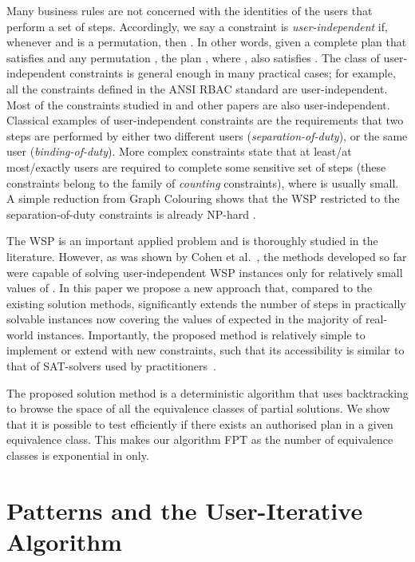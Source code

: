\documentclass[runningheads,proof]{llncs}
\begin{document}
Many business rules are not concerned with the identities of the users that perform a set of steps.  Accordingly, we say a constraint  is \emph{user-independent} if, whenever  and  is a permutation, then . 
In other words, given a complete plan  that satisfies  and any permutation , the plan , where , also satisfies .
The class of user-independent constraints is general enough in many practical cases; for example, all the constraints defined in the ANSI RBAC standard \cite{ANSI04} are user-independent. 
Most of the constraints studied in \cite{FAW2014,JOCO2014,CrGuYe13,WaLi10} and other papers are also user-independent. 
Classical examples of user-independent constraints are the requirements that two steps are performed by either two different users ({\em separation-of-duty}), or the same user ({\em binding-of-duty}). More complex constraints state that at least/at most/exactly  users are required to complete some sensitive set of steps (these constraints belong to the family of \emph{counting} constraints), where  is usually small. 
A simple reduction from {\sc Graph Colouring} shows that the WSP restricted to the separation-of-duty constraints is already NP-hard \cite{WaLi10}.

The WSP is an important applied problem and is thoroughly studied
in the literature.  However, as was shown by Cohen et al.~\cite{FAW2014}, 
the methods developed so far  were 
capable of solving user-independent WSP instances only for relatively small values of .  
In this paper we propose a new approach that, compared to the existing solution methods, significantly extends the number of steps in practically solvable instances now covering the values of  expected in the majority of real-world instances. 
Importantly, the proposed method is relatively simple to implement or extend with new constraints, such that its accessibility is similar to that of SAT-solvers used by practitioners~\cite{WaLi10}.



The proposed solution method is a deterministic algorithm that uses backtracking to browse the space of all the equivalence classes of partial solutions. 
We show that it is possible to test efficiently if there exists an authorised plan in a given equivalence class.
This makes our algorithm FPT as the number of equivalence classes is exponential in  only.







\section{Patterns and the User-Iterative Algorithm}
\label{sec:patterns-and-ui}
\end{document}
